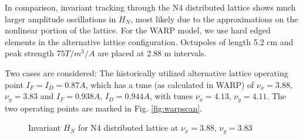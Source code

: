 In comparison, invariant tracking through the N4 distributed lattice shows much larger amplitude oscillations in $H_N$, most likely due to the approximations on the nonlinear portion of the lattice. For the WARP model, we use hard edged elements in the alternative lattice configuration. Octupoles of length 5.2 cm and peak strength $75 T/m^3/A$ are placed at 2.88 m intervals. 

Two cases are considered:  The historically utilized alternative lattice operating point $I_F=I_D=0.87 A$, which has a tune (as calculated in WARP) of $\nu_x=3.88$, $\nu_y=3.83$ and $I_F=0.938 A$, $I_D=0.944 A$, with tunes $\nu_x=4.13$, $\nu_y=4.11$. The two operating points are marked in Fig. \ref{fig:warpscan}. 

\begin{figure}[]
   \centering
 	\caption{Invariant $H_N$ for N4 distributed lattice at $\nu_x=3.88$, $\nu_y=3.83$}
   \label{fig:N4invar1}
\end{figure}

